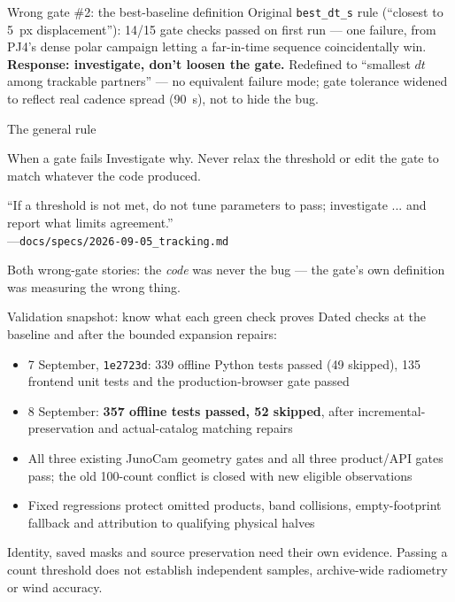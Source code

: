 \documentclass[aspectratio=169,11pt]{beamer}
\newcommand{\currevsec}{}
\newcommand{\revsec}[1]{\gdef\currevsec{#1}}
\begin{document}
\begin{frame}{Wrong gate \#2: the best-baseline definition}
  \revsec{5}
  Original \texttt{best\_dt\_s} rule (``closest to 5~px displacement''): 14/15 gate checks passed on first run --- one failure, from PJ4's dense polar campaign letting a far-in-time sequence coincidentally win.
  \vspace{0.2cm}
  \textbf{Response: investigate, don't loosen the gate.} Redefined to ``smallest $dt$ among trackable partners'' --- no equivalent failure mode; gate tolerance widened to reflect real cadence spread (90~s), not to hide the bug.
\end{frame}

\begin{frame}{The general rule}
  \revsec{5}
  \begin{alertblock}{When a gate fails}
    Investigate why. Never relax the threshold or edit the gate to match whatever the code produced.
  \end{alertblock}
  \vspace{0.2cm}
  \small ``If a threshold is not met, do not tune parameters to pass; investigate ... and report what limits agreement.''\\
  \hfill---\texttt{docs/specs/2026-09-05\_tracking.md}
  \vspace{0.2cm}

  Both wrong-gate stories: the \emph{code} was never the bug --- the gate's own definition was measuring the wrong thing.
\end{frame}

\begin{frame}{Validation snapshot: know what each green check proves}
  \revsec{5}
\small Dated checks at the baseline and after the bounded expansion repairs:
  \begin{itemize}
    \item 7 September, \texttt{1e2723d}: 339 offline Python tests passed (49 skipped), 135 frontend unit tests and the production-browser gate passed
    \item 8 September: \textbf{357 offline tests passed, 52 skipped}, after incremental-preservation and actual-catalog matching repairs
    \item All three existing JunoCam geometry gates and all three product/API gates pass; the old 100-count conflict is closed with new eligible observations
    \item Fixed regressions protect omitted products, band collisions, empty-footprint fallback and attribution to qualifying physical halves
  \end{itemize}
  \vspace{0.2cm}
  Identity, saved masks and source preservation need their own evidence. Passing a count threshold does not establish independent samples, archive-wide radiometry or wind accuracy.
\end{frame}
\end{document}
